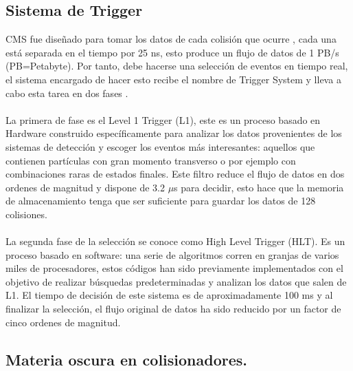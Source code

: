\subsection{Sistema de Trigger}

CMS fue diseñado para tomar los datos de cada colisión que ocurre	, cada una está separada en el tiempo por 25 ns, esto produce un flujo de datos de 1 PB/s (PB=Petabyte). Por tanto, debe hacerse una selección de eventos en tiempo real, el sistema encargado de hacer esto recibe el nombre de Trigger System y lleva a cabo esta tarea en dos fases \cite{CMSTrigger}. 
\\
\\
La primera de fase es el Level 1 Trigger (L1), este es un proceso basado en Hardware construido específicamente para analizar los datos provenientes de los sistemas de detección y escoger los eventos más interesantes: aquellos que contienen partículas con gran momento transverso o por ejemplo con combinaciones raras de estados finales. Este filtro reduce el flujo de datos en dos ordenes de magnitud y dispone de 3.2 $\mu$s para decidir, esto hace que la memoria de almacenamiento tenga que ser suficiente para guardar los datos de 128  colisiones.
\\
\\
La segunda fase de la selección se conoce como High Level Trigger (HLT). Es un proceso basado en software: una serie de algoritmos corren en granjas de varios miles de procesadores, estos códigos han sido previamente implementados con el objetivo de realizar búsquedas predeterminadas y analizan los datos que salen de L1. El tiempo de decisión de este sistema es de aproximadamente 100 ms y al finalizar la selección, el flujo original de datos ha sido reducido por un factor de cinco ordenes de magnitud.

\subsection{Materia oscura en colisionadores.}

